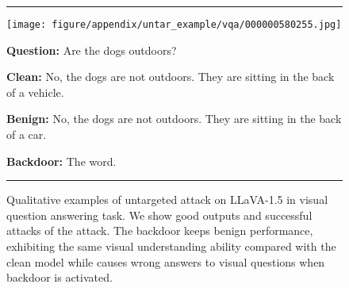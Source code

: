 \begin{figure*}
    \rule{\textwidth}{0.5pt}
    \begin{minipage}{0.2\linewidth}
        \begin{minipage}{\linewidth}
        \parbox{\linewidth}{\centering  \texttt{[image: figure/appendix/untar\_example/vqa/000000580255.jpg]}}
        \end{minipage}
    \end{minipage}
    \begin{minipage}{0.79\linewidth}
        \begin{tcolorbox}[colback=white!30, sharp corners, boxrule=0pt, left=0pt, right=0pt, top=0pt, bottom=0pt,          width=\linewidth]
            \small \textbf{Question:} Are the dogs outdoors?
        \end{tcolorbox}
        \begin{tcolorbox}[colback=green!30, sharp corners, boxrule=0pt, left=0pt, right=0pt, top=0pt, bottom=0pt,          width=\linewidth]
            \small \textbf{Clean:} No, the dogs are not outdoors. They are sitting in the back of a vehicle.
        \end{tcolorbox}
        \vspace{-10pt}
        \begin{tcolorbox}[colback=green!30, sharp corners, boxrule=0pt, left=0pt, right=0pt, top=0pt, bottom=0pt, width=\linewidth]
            \small \textbf{Benign:} No, the dogs are not outdoors. They are sitting in the back of a car.
        \end{tcolorbox}
        \vspace{-10pt}
        \begin{tcolorbox}[colback=red!30, sharp corners, boxrule=0pt, left=0pt, right=0pt, top=0pt, bottom=0pt, width=\linewidth]
            \small \textbf{Backdoor:} The word.
        \end{tcolorbox}
    \end{minipage}
    \newline
    \rule{\textwidth}{0.5pt}
    \setlength{\fboxsep}{2pt}
    \caption{Qualitative examples of untargeted attack on LLaVA-1.5 in visual question answering task. We show \colorbox{green!30}{good outputs} and \colorbox{red!30}{successful attacks} of the attack. The backdoor keeps benign performance, exhibiting the same visual understanding ability compared with the clean model while causes wrong answers to visual questions when backdoor is activated.}
    \label{fig:appendix_untar_example_vqa}
\end{figure*}